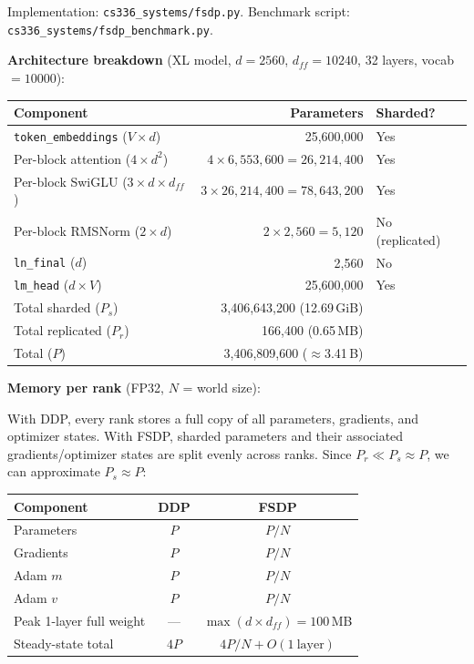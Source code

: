 \documentclass[11pt]{article}
\begin{document}
Implementation: \texttt{cs336\_systems/fsdp.py}.
Benchmark script: \texttt{cs336\_systems/fsdp\_benchmark.py}.

\textbf{Architecture breakdown} (XL model, $d=2560$, $d_{ff}=10240$, 32 layers, vocab$=10000$):

\begin{center}
\begin{tabular}{l r l}
\toprule
Component & Parameters & Sharded? \\
\midrule
\texttt{token\_embeddings} ($V \times d$) & 25,600,000 & Yes \\
Per-block attention ($4 \times d^2$) & $4 \times 6{,}553{,}600 = 26{,}214{,}400$ & Yes \\
Per-block SwiGLU ($3 \times d \times d_{ff}$) & $3 \times 26{,}214{,}400 = 78{,}643{,}200$ & Yes \\
Per-block RMSNorm ($2 \times d$) & $2 \times 2{,}560 = 5{,}120$ & No (replicated) \\
\texttt{ln\_final} ($d$) & 2,560 & No \\
\texttt{lm\_head} ($d \times V$) & 25,600,000 & Yes \\
\midrule
Total sharded ($P_s$) & 3,406,643,200 (12.69\,GiB) & \\
Total replicated ($P_r$) & 166,400 (0.65\,MB) & \\
Total ($P$) & 3,406,809,600 ($\approx$3.41\,B) & \\
\bottomrule
\end{tabular}
\end{center}

\textbf{Memory per rank} (FP32, $N$ = world size):

With DDP, every rank stores a full copy of all parameters, gradients, and
optimizer states.  With FSDP, sharded parameters and their associated
gradients/optimizer states are split evenly across ranks.  Since
$P_r \ll P_s \approx P$, we can approximate $P_s \approx P$:

\begin{center}
\begin{tabular}{l cc}
\toprule
Component & DDP & FSDP \\
\midrule
Parameters    & $P$ & $P/N$ \\
Gradients     & $P$ & $P/N$ \\
Adam $m$      & $P$ & $P/N$ \\
Adam $v$      & $P$ & $P/N$ \\
Peak 1-layer full weight & --- & $\max(d \times d_{ff}) = 100$\,MB \\
\midrule
Steady-state total & $4P$ & $4P/N + O(1~\text{layer})$ \\
\bottomrule
\end{tabular}
\end{center}
\end{document}
